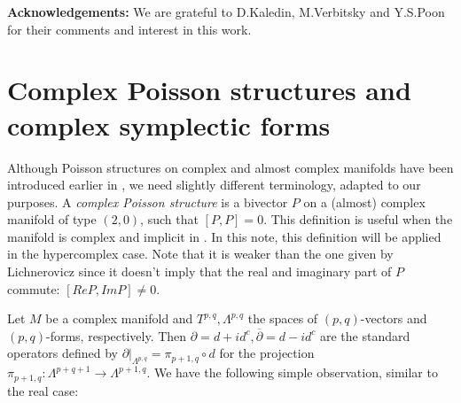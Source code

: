 \documentclass[11pt,oneside,leqno]{amsart}
\theoremstyle{plain}
\theoremstyle{definition}
\begin{document}
{\bf Acknowledgements:} We are grateful to D.Kaledin, M.Verbitsky and Y.S.Poon for their comments and interest in this work.

 

\section{Complex Poisson structures and complex symplectic forms}

Although Poisson structures on complex and almost complex manifolds have been introduced earlier in \cite{L, CFIU}, we need slightly different terminology, adapted to our purposes. A {\it complex Poisson structure} is a bivector $P$ on a (almost) complex manifold
of type $(2,0)$, such that $[P,P]=0$. This definition is useful when the manifold is complex and implicit in \cite{P}. In this note, this definition will be applied in the hypercomplex case. Note that it is weaker than the one given by Lichnerovicz \cite{L} since it doesn't imply that the real and imaginary part of $P$ commute: $[Re P,Im P] \neq 0$.

Let $M$ be a complex manifold and $T^{p,q}, \Lambda^{p,q}$  the spaces of $(p,q)$-vectors and $(p,q)$-forms, respectively. Then $\partial = d+id^c, \overline{\partial}=d-id^c$ are the standard operators defined by $\partial|_{\Lambda^{p,q}}=\pi_{p+1,q}\circ d$ for the projection $\pi_{p+1,q}:\Lambda^{p+q+1}\rightarrow \Lambda^{p+1,q}$. We have the following simple observation, similar to the real case:
\end{document}
